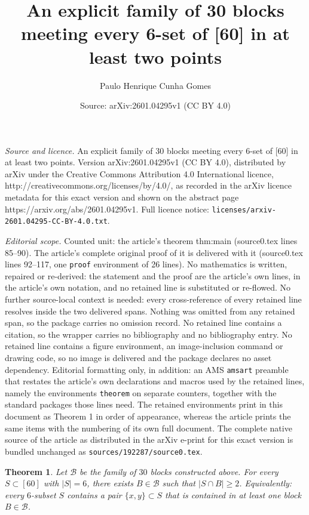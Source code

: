 \documentclass[10pt,a4paper]{amsart}
\title{An explicit family of 30 blocks meeting every 6-set of [60] in at least two points}
\author{Paulo Henrique Cunha Gomes}
\date{Source: arXiv:2601.04295v1 (CC BY 4.0)}
\newtheorem{theorem}{Theorem}
\begin{document}
\maketitle

\noindent\emph{Source and licence.} An explicit family of 30 blocks meeting every 6-set of [60] in at least two points. Version arXiv:2601.04295v1 (CC BY 4.0), distributed by arXiv under the Creative Commons Attribution 4.0 International licence, http://creativecommons.org/licenses/by/4.0/, as recorded in the arXiv licence metadata for this exact version and shown on the abstract page https://arxiv.org/abs/2601.04295v1. Full licence notice: \texttt{licenses/arxiv-2601.04295-CC-BY-4.0.txt}.\par\smallskip

\noindent\textit{Editorial scope.} Counted unit: the article's theorem thm:main (source0.tex lines 85--90). The article's complete original proof of it is delivered with it (source0.tex lines 92--117, one \texttt{proof} environment of 26 lines). No mathematics is written, repaired or re-derived: the statement and the proof are the article's own lines, in the article's own notation, and no retained line is substituted or re-flowed.  No further source-local context is needed: every cross-reference of every retained line resolves inside the two delivered spans.  Nothing was omitted from any retained span, so the package carries no omission record.  No retained line contains a citation, so the wrapper carries no bibliography and no bibliography entry.  No retained line contains a figure environment, an image-inclusion command or drawing code, so no image is delivered and the package declares no asset dependency.  Editorial formatting only, in addition: an AMS \texttt{amsart} preamble that restates the article's own declarations and macros used by the retained lines, namely the environments \texttt{theorem} on separate counters, together with the standard packages those lines need.  The retained environments print in this document as Theorem 1 in order of appearance, whereas the article prints the same items with the numbering of its own full document.  The complete native source of the article as distributed in the arXiv e-print for this exact version is bundled unchanged as \texttt{sources/192287/source0.tex}.
\begin{theorem}\label{thm:main}
Let $\mathcal{B}$ be the family of $30$ blocks constructed above. For every $S\subset[60]$ with
$|S|=6$, there exists $B\in\mathcal{B}$ such that $|S\cap B|\ge 2$.
Equivalently: every $6$-subset $S$ contains a pair $\{x,y\}\subset S$ that is contained in at least
one block $B\in\mathcal{B}$.
\end{theorem}
\end{document}
